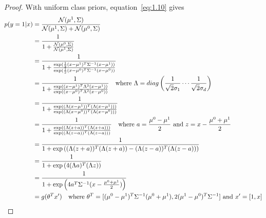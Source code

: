\documentclass{article}
\begin{document}
\subsection{}
\begin{proof}
With uniform class priors, equation~\ref{eq:1.10} gives
\begin{equation}
  \label{eq:1.12}
  \begin{split}
    p(y=1 | x) &= \frac{\mathcal{N}(\mu^1,\Sigma)}{\mathcal{N}(\mu^1,\Sigma) + \mathcal{N}(\mu^0,\Sigma)} \\
               &= \frac{1}{1 + \frac{\mathcal{N}(\mu^0,\Sigma)}{\mathcal{N}(\mu^1,\Sigma)}} \\
               &= \frac{1}{1 + \frac{\exp(\frac{1}{2}(x-\mu^1)^T\Sigma^{-1}(x-\mu^1))}{\exp(\frac{1}{2}(x-\mu^0)^T\Sigma^{-1}(x-\mu^0))}} \\
               &= \frac{1}{1 + \frac{\exp((x-\mu^1)^T\Lambda^2(x-\mu^1))}{\exp((x-\mu^0)^T\Lambda^2(x-\mu^0))}}
                  \text{\quad where $\Lambda = diag\left(\frac{1}{\sqrt{2}\sigma_1} \cdots \frac{1}{\sqrt{2}\sigma_d}\right)$} \\
               &= \frac{1} {1 + \frac{\exp((\Lambda(x-\mu^1))^T(\Lambda(x-\mu^1)))}
                                     {\exp((\Lambda(x-\mu^0))^T(\Lambda(x-\mu^0)))}
                           }\\
               &= \frac{1} {1 + \frac{\exp((\Lambda(z+a))^T(\Lambda(z+a)))}
                                     {\exp((\Lambda(z-a))^T(\Lambda(z-a)))}
                           }
                  \text{\quad where $a = \frac{\mu^0 - \mu^1}{2} $ and $z = x - \frac{\mu^0 + \mu^1}{2}$} \\
               &= \frac{1} {1 + \exp\left( 
                                          (\Lambda(z+a))^T(\Lambda(z+a)) - (\Lambda(z-a))^T(\Lambda(z-a))
                                     \right)
                           } \\
               &= \frac{1} {1 + \exp\left( 
                                          4(\Lambda a)^T(\Lambda z)
                                     \right)
                           } \\
               &= \frac{1} {1 + \exp\left( 
                                          4a^T\Sigma^{-1}(x - \frac{\mu^0 + \mu^1}{2})
                                     \right)
                           } \\
               &= g(\theta^T x') 
                  \text{\quad where $\theta^T = [(\mu^0-\mu^1)^T\Sigma^{-1}(\mu^0+\mu^1),2(\mu^1 - \mu^0)^T\Sigma^{-1}]$ and $x'= [1,x]$}
  \end{split}
\end{equation}
\end{proof}
\end{document}
